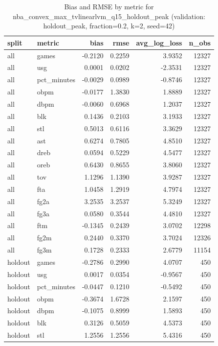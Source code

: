 \begin{table}
\caption{Bias and RMSE by metric for nba_convex_max_tvlinearlvm_q15_holdout_peak (validation: holdout_peak, fraction=0.2, k=2, seed=42)}
\label{tab:nba_convex_max_tvlinearlvm_q15_holdout_peak_vs_holdout_peak_f20_k2_s42_bias_rmse}
\begin{tabular}{llrrrr}
\toprule
split & metric & bias & rmse & avg\_log\_loss & n\_obs \\
\midrule
all & games & -0.2120 & 0.2259 & 3.9352 & 12327 \\
all & usg & 0.0001 & 0.0202 & -2.3531 & 12327 \\
all & pct\_minutes & -0.0029 & 0.0989 & -0.8746 & 12327 \\
all & obpm & -0.0177 & 1.3830 & 1.8889 & 12327 \\
all & dbpm & -0.0060 & 0.6968 & 1.2037 & 12327 \\
all & blk & 0.1436 & 0.2103 & 3.1933 & 12327 \\
all & stl & 0.5013 & 0.6116 & 3.3629 & 12327 \\
all & ast & 0.6274 & 0.7805 & 4.8510 & 12327 \\
all & dreb & 0.0594 & 0.5229 & 4.5477 & 12327 \\
all & oreb & 0.6430 & 0.8655 & 3.8060 & 12327 \\
all & tov & 1.1296 & 1.1390 & 3.9287 & 12327 \\
all & fta & 1.0458 & 1.2919 & 4.7974 & 12327 \\
all & fg2a & 3.2535 & 3.2537 & 5.3249 & 12327 \\
all & fg3a & 0.0580 & 0.3544 & 4.4810 & 12327 \\
all & ftm & -0.1345 & 0.2439 & 3.0702 & 12298 \\
all & fg2m & 0.2440 & 0.3370 & 3.7024 & 12326 \\
all & fg3m & 0.1728 & 0.2333 & 2.6779 & 11154 \\
holdout & games & -0.2786 & 0.2990 & 4.0707 & 450 \\
holdout & usg & 0.0017 & 0.0354 & -0.9567 & 450 \\
holdout & pct\_minutes & -0.0447 & 0.1210 & -0.5492 & 450 \\
holdout & obpm & -0.3674 & 1.6728 & 2.1597 & 450 \\
holdout & dbpm & -0.1075 & 0.8999 & 1.5893 & 450 \\
holdout & blk & 0.3126 & 0.5059 & 4.5373 & 450 \\
holdout & stl & 1.2556 & 1.2556 & 5.4316 & 450 \\

\end{tabular}
\end{table}
